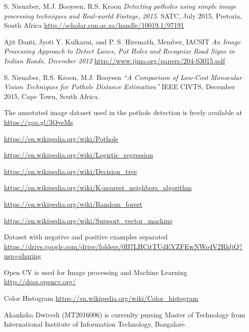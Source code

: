 \documentclass[journal]{IEEEtran}
\begin{document}
\begin{thebibliography}{1}

S. Nienaber, M.J. Booysen, R.S. Kroon
\textit{Detecting potholes using simple image processing techniques and Real-world Footage, 2015}. 
SATC, July 2015, Pretoria, South Africa
\url{http://scholar.sun.ac.za/handle/10019.1/97191}
 
Ajit Danti, Jyoti Y. Kulkarni, and P. S. Hiremath, Member, IACSIT
\textit{An Image Processing Approach to Detect Lanes, Pot Holes and Recognize Road Signs in Indian Roads, December 2012}
\url{http://www.ijmo.org/papers/204-S3015.pdf}

S. Nienaber, R.S. Kroon, M.J. Booysen  
\textit{“A Comparison of Low-Cost Monocular Vision Techniques for Pothole Distance Estimation”}
IEEE CIVTS, December 2015, Cape Town, South Africa.
 
The annotated image dataset used in the pothole detection is freely available at
\url{https://goo.gl/3QyeMs}

\url{https://en.wikipedia.org/wiki/Pothole}

\url{https://en.wikipedia.org/wiki/Logistic_regression}

\url{https://en.wikipedia.org/wiki/Decision_tree}

\url{https://en.wikipedia.org/wiki/K-nearest_neighbors_algorithm}

\url{https://en.wikipedia.org/wiki/Random_forest}

\url{https://en.wikipedia.org/wiki/Support_vector_machine}

Dataset with negative and positive examples separated
\url{https://drive.google.com/drive/folders/0B7LHCitTUdEYZFEwNWo4V2RldjQ?usp=sharing}

Open CV is used for Image processing and Machine Learning
\url{http://docs.opencv.org/}


Color Histogram
\url{https://en.wikipedia.org/wiki/Color_histogram}

\end{thebibliography}

\begin{IEEEbiography}{Akanksha Dwivedi}
(MT2016006) is currenlty pursing Master of Technology from International Institute of Information Technology, Bangalore. 
\end{IEEEbiography}
\end{document}
